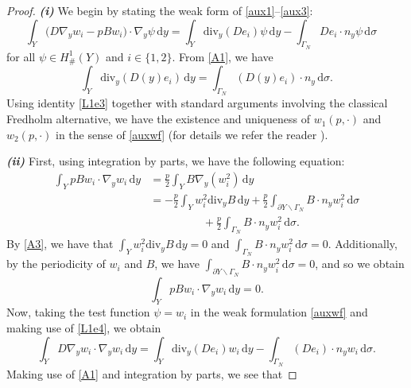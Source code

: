 \documentclass[11pt]{article}
\newcommand{\di}[1]{\,\mathrm{d}#1}
\begin{document}
\begin{proof}
\par \textbf{\textit{(i)}} We begin by stating the weak form of \eqref{aux1}--\eqref{aux3}:
\begin{equation}
      \int_{Y} \big(D\nabla_y w_i- pBw_i\big)\cdot \nabla_y \psi\di{y}=\int_{Y} \mathrm{div}_y( D e_i)\psi \di{y}-\int_{\Gamma_N} De_i\cdot n_y\psi \di{\sigma}\quad \label{auxwf}
\end{equation}
%
for all $\psi\in H_{\#}^1(Y)$ and $i\in\{1,2\}$. 
From \ref{A1}, we have \begin{equation}\label{L1e3}
    \int_Y \mathrm{div}_y (D(y) e_i) \di{y}= \int_{\Gamma_N} (D(y) e_i)\cdot n_y \di{\sigma}.
\end{equation}
Using identity \eqref{L1e3} together with standard arguments involving the classical Fredholm alternative, we have the existence and uniqueness of $w_1(p,\cdot)$ and $w_2(p,\cdot)$ in the sense of \eqref{auxwf} (for details we refer the reader \cite[Section 4]{ALLAIRE20102292}).
%
\par\textbf{\textit{(ii)}} First, using integration by parts,  we have the following equation:
\begin{align}
    \int_{Y}pBw_i\cdot \nabla_y w_i\di{y}&=\frac{p}{2}\int_{Y}B\nabla_y (w_i^2)\di{y}\nonumber\\
    &=-\frac{p}{2}\int_{Y}w_i^2\mathrm{div}_y B\di{y}+\frac{p}{2}\int_{\partial Y\backslash \Gamma_N} B\cdot n_y w_i^2\di{\sigma}\nonumber\\
    &\hspace{2cm}+\frac{p}{2}\int_{\Gamma_N} B\cdot n_y w_i^2\di{\sigma}.\label{xL1e4}
\end{align}
 By \ref{A3}, we have that $\int_{Y}w_i^2\mathrm{div}_y B\di{y}=0$ and $\int_{\Gamma_N} B\cdot n_y w_i^2\di{\sigma}=0$.
 Additionally, by the periodicity of $w_i$ and $B$, we have $\int_{\partial Y\backslash \Gamma_N} B\cdot n_y w_i^2\di{\sigma}=0$, and so we obtain
 \begin{equation}
    \int_{Y}pBw_i\cdot \nabla_y w_i\di{y}=0.\label{L1e4}
\end{equation}
Now, taking the test function $\psi = w_i$ in the weak formulation \eqref{auxwf} and making use of \eqref{L1e4}, we obtain
\begin{equation}
     \int_{Y} D\nabla_y w_i\cdot\nabla_y w_i \di{y} =\int_{Y} \mathrm{div}_y (D e_i) w_i \di{y}-\int_{\Gamma_N}\left( De_i\right)\cdot n_y w_i \di{\sigma}.\label{L1e5}
\end{equation}
Making use of \ref{A1} and integration by parts, we see that 

\end{proof}
\end{document}
